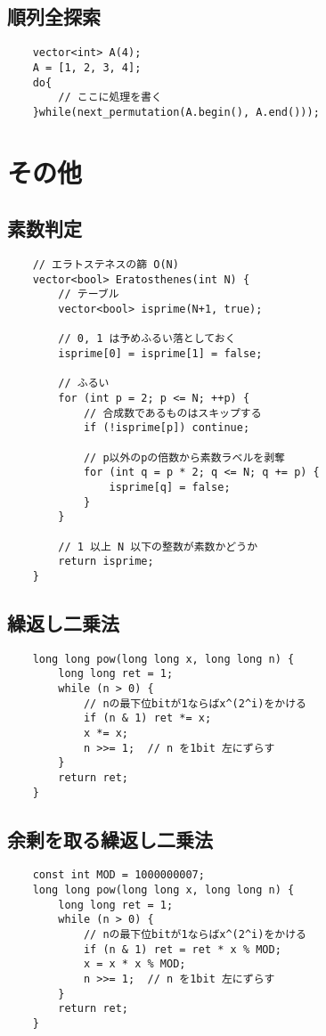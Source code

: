 \documentclass[a4paper, landscape, 9pt]{jarticle} %
\begin{document}
\begin{multicols*}{3}
    \subsection{順列全探索}
    \begin{lstlisting}
    vector<int> A(4);
    A = [1, 2, 3, 4];
    do{
        // ここに処理を書く
    }while(next_permutation(A.begin(), A.end()));
    \end{lstlisting}


    \section{その他}
    \subsection{素数判定}
    \begin{lstlisting}
    // エラトステネスの篩 O(N)
    vector<bool> Eratosthenes(int N) {
        // テーブル
        vector<bool> isprime(N+1, true);
    
        // 0, 1 は予めふるい落としておく
        isprime[0] = isprime[1] = false;
    
        // ふるい
        for (int p = 2; p <= N; ++p) {
            // 合成数であるものはスキップする
            if (!isprime[p]) continue;
    
            // p以外のpの倍数から素数ラベルを剥奪
            for (int q = p * 2; q <= N; q += p) {
                isprime[q] = false;
            }
        }
    
        // 1 以上 N 以下の整数が素数かどうか
        return isprime;
    }
    \end{lstlisting}

    \subsection{繰返し二乗法}
    \begin{lstlisting}
    long long pow(long long x, long long n) {
        long long ret = 1;
        while (n > 0) {
            // nの最下位bitが1ならばx^(2^i)をかける
            if (n & 1) ret *= x;  
            x *= x;
            n >>= 1;  // n を1bit 左にずらす
        }
        return ret;
    }
    \end{lstlisting}

    \subsection{余剰を取る繰返し二乗法}
    \begin{lstlisting}
    const int MOD = 1000000007;
    long long pow(long long x, long long n) {
        long long ret = 1;
        while (n > 0) {
            // nの最下位bitが1ならばx^(2^i)をかける
            if (n & 1) ret = ret * x % MOD;  
            x = x * x % MOD;
            n >>= 1;  // n を1bit 左にずらす
        }
        return ret;
    }
    \end{lstlisting}


\end{multicols*}
\end{document}
